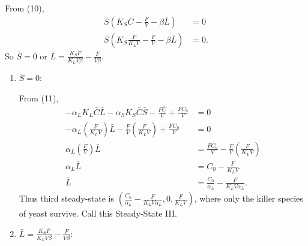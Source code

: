   From (10), 
  \begin{align*}
    \bar{S}\left( K_S \bar{C} - \frac{F}{V} - \beta \bar{L} \right) &= 0 \\
    \bar{S}\left( K_S \frac{F}{K_L V} - \frac{F}{V} - \beta \bar{L} \right) &= 0.
  \end{align*}
  So $\bar{S} = 0$ or $\bar{L} = \frac{K_S F}{K_L V \beta} - \frac{F}{V \beta}$.
  
  \begin{enumerate}

    \item $\bar{S} = 0$:
      
    From (11), 
    \begin{align*}
      -\alpha_L K_L \bar{C}\bar{L} -\alpha_S K_S \bar{C}\bar{S} - \frac{F\bar{C}}{V} + \frac{FC_0}{V} &= 0 \\
      -\alpha_L \left( \frac{F}{K_L V} \right) \bar{L} - \frac{F}{V} \left( \frac{F}{K_L V} \right) + \frac{FC_0}{V} &= 0 \\
      \alpha_L \left( \frac{F}{V} \right) \bar{L} &= \frac{FC_0}{V} - \frac{F}{V} \left( \frac{F}{K_L V} \right) \\
      \alpha_L \bar{L} &= C_0 - \frac{F}{K_L V} \\
      \bar{L} &= \frac{C_0}{\alpha_L} - \frac{F}{K_L V \alpha_L}.
    \end{align*}
    Thus third steady-state is {\color{red}$\left( \frac{C_0}{\alpha_L} - \frac{F}{K_L V \alpha_L}, 0, \frac{F}{K_L V} \right)$}, where only the killer species of yeast survive.  Call this {\color{red}Steady-State III}.

    \item $\bar{L} = \frac{K_S F}{K_L V \beta} - \frac{F}{V \beta}$:


\end{enumerate}
